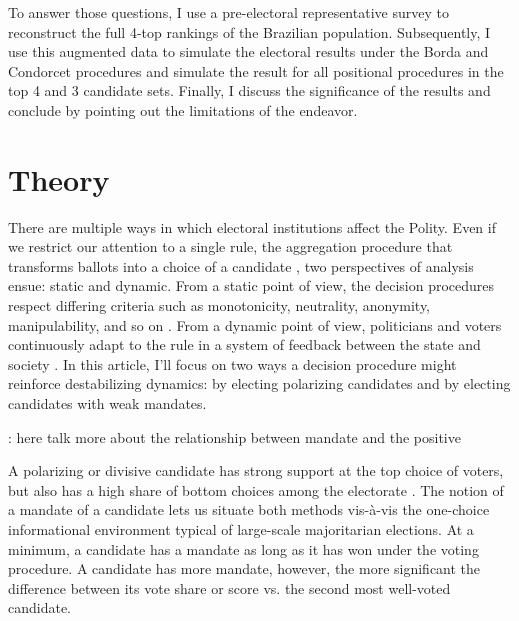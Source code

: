 \documentclass[hidelinks,11pt]{article}
\begin{document}
To answer those questions, I use a pre-electoral representative survey to
reconstruct the full 4-top rankings of the Brazilian population. Subsequently, I
use this augmented data to simulate the electoral results under the Borda and
Condorcet procedures and simulate the result for all positional procedures in
the top 4 and 3 candidate sets. Finally, I discuss the significance of the
results and conclude by pointing out the limitations of the endeavor.



\section{Theory}
There are multiple ways in which electoral institutions affect the Polity. Even
if we restrict our attention to a single rule, the aggregation procedure that
transforms ballots into a choice of a candidate \parencite{Goodin_2006}, two
perspectives of analysis ensue: static and dynamic. From a static point of view,
the decision procedures respect differing criteria such as monotonicity,
neutrality, anonymity, manipulability, and so on \parencite{nurmi1999voting}.
From a dynamic point of view, politicians and voters continuously adapt to the
rule in a system of feedback between the state and society
\parencite{Wange2021systems}. In this article, I'll focus on two ways a decision
procedure might reinforce destabilizing dynamics: by electing polarizing
candidates and by electing candidates with weak mandates.

\Big{\textcolor{red}{TODO}}: here talk more about the relationship between mandate and the positive

A polarizing or divisive candidate has strong support at the top
choice of voters, but also has a high share of bottom choices among the
electorate \parencite{igersheim22_compar_votin_method}.
The notion of a mandate of a candidate lets us situate both methods vis-{\`a}-vis
the one-choice informational environment typical of large-scale majoritarian
elections. At a minimum, a candidate has a mandate as long as it has won
under the voting procedure. A candidate has more mandate, however, the more significant
the difference between its vote share or score vs. the second most well-voted
candidate.
\end{document}
